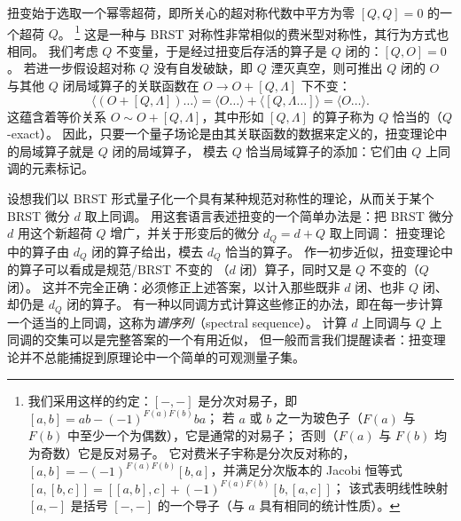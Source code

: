 扭变始于选取一个幂零超荷，即所关心的超对称代数中平方为零 $[Q,Q]=0$ 的一个超荷 $Q$。
\footnote{我们采用这样的约定：$[-, -]$ 是分次对易子，即 $[a,b]=ab-(-1)^{F(a)F(b)}ba$；
若 $a$ 或 $b$ 之一为玻色子（$F(a)$ 与 $F(b)$ 中至少一个为偶数），它是通常的对易子；
否则（$F(a)$ 与 $F(b)$ 均为奇数）它是反对易子。
它对费米子宇称是分次反对称的，$[a,b]=-(-1)^{F(a)F(b)}[b,a]$，并满足分次版本的 Jacobi 恒等式
$[a,[b,c]]=[[a,b],c]+(-1)^{F(a)F(b)}[b,[a,c]]$；
该式表明线性映射 $[a,-]$ 是括号 $[-, -]$ 的一个导子（与 $a$ 具有相同的统计性质）。}
这是一种与 BRST 对称性非常相似的费米型对称性，其行为方式也相同。
我们考虑 $Q$ 不变量，于是经过扭变后存活的算子是 $Q$ 闭的：$[Q,O]=0$。
若进一步假设超对称 $Q$ 没有自发破缺，即 $Q$ 湮灭真空，则可推出 $Q$ 闭的 $O$ 与其他 $Q$ 闭局域算子的关联函数在 $O\to O+[Q,\Lambda]$ 下不变：
\begin{equation}\tag{2.1}
\langle (O+[Q,\Lambda])\dots\rangle=\langle O\dots\rangle+\langle [Q,\Lambda\dots]\rangle=\langle O\dots\rangle.
\end{equation}
这蕴含着等价关系 $O\sim O+[Q,\Lambda]$，其中形如 $[Q,\Lambda]$ 的算子称为 $Q$ 恰当的（$Q$-exact）。
因此，只要一个量子场论是由其关联函数的数据来定义的，扭变理论中的局域算子就是 $Q$ 闭的局域算子，
模去 $Q$ 恰当局域算子的添加：它们由 $Q$ 上同调的元素标记。

设想我们以 BRST 形式量子化一个具有某种规范对称性的理论，从而关于某个 BRST 微分 $d$ 取上同调。
用这套语言表述扭变的一个简单办法是：把 BRST 微分 $d$ 用这个新超荷 $Q$ 增广，并关于形变后的微分 $d_Q=d+Q$ 取上同调：
扭变理论中的算子由 $d_Q$ 闭的算子给出，模去 $d_Q$ 恰当的算子。
作一初步近似，扭变理论中的算子可以看成是规范/BRST 不变的%
（$d$ 闭）算子，同时又是 $Q$ 不变的（$Q$ 闭）。
这并不完全正确：必须修正上述答案，以计入那些既非 $d$ 闭、也非 $Q$ 闭、却仍是 $d_Q$ 闭的算子。
有一种以同调方式计算这些修正的办法，即在每一步计算一个适当的上同调，这称为\emph{谱序列}（spectral sequence）。
计算 $d$ 上同调与 $Q$ 上同调的交集可以是完整答案的一个有用近似，
但一般而言我们提醒读者：扭变理论并不总能捕捉到原理论中一个简单的可观测量子集。

